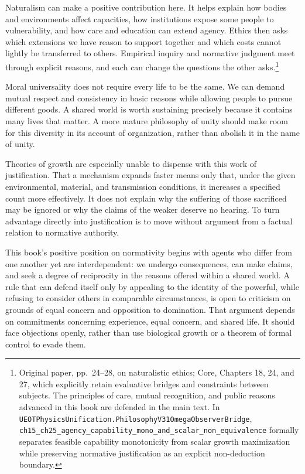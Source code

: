\documentclass[
  english,
  11pt,
  oneside]{book}
\begin{document}
Naturalism can make a positive contribution here. It helps explain how bodies and environments affect capacities, how institutions expose some people to vulnerability, and how care and education can extend agency. Ethics then asks which extensions we have reason to support together and which costs cannot lightly be transferred to others. Empirical inquiry and normative judgment meet through explicit reasons, and each can change the questions the other asks.\footnote{\hypertarget{ph-note-59}{}Original paper, pp.~24--28, on naturalistic ethics; Core, Chapters 18, 24, and 27, which explicitly retain evaluative bridges and constraints between subjects. The principles of care, mutual recognition, and public reasons advanced in this book are defended in the main text. In \nolinkurl{UEOTPhysicsUnification.PhilosophyV31OmegaObserverBridge}, \nolinkurl{ch15_ch25_agency_capability_mono_and_scalar_non_equivalence} formally separates feasible capability monotonicity from scalar growth maximization while preserving normative justification as an explicit non-deduction boundary.}

Moral universality does not require every life to be the same. We can demand mutual respect and consistency in basic reasons while allowing people to pursue different goods. A shared world is worth sustaining precisely because it contains many lives that matter. A more mature philosophy of unity should make room for this diversity in its account of organization, rather than abolish it in the name of unity.

Theories of growth are especially unable to dispense with this work of justification. That a mechanism expands faster means only that, under the given environmental, material, and transmission conditions, it increases a specified count more effectively. It does not explain why the suffering of those sacrificed may be ignored or why the claims of the weaker deserve no hearing. To turn advantage directly into justification is to move without argument from a factual relation to normative authority.

This book's positive position on normativity begins with agents who differ from one another yet are interdependent: we undergo consequences, can make claims, and seek a degree of reciprocity in the reasons offered within a shared world. A rule that can defend itself only by appealing to the identity of the powerful, while refusing to consider others in comparable circumstances, is open to criticism on grounds of equal concern and opposition to domination. That argument depends on commitments concerning experience, equal concern, and shared life. It should face objections openly, rather than use biological growth or a theorem of formal control to evade them.
\end{document}
